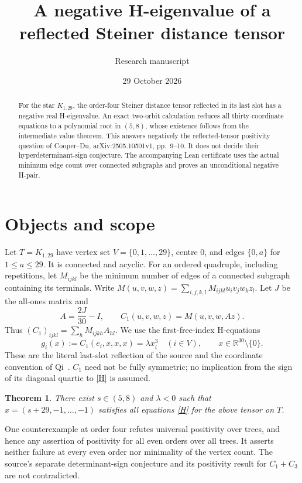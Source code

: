 \documentclass[11pt]{article}
\title{A negative H-eigenvalue of a reflected Steiner distance tensor}
\author{Research manuscript}
\date{29 October 2026}
\newtheorem{theorem}{Theorem}
\newcommand{\R}{\mathbb R}
\begin{document}
\maketitle
\begin{abstract}
For the star $K_{1,29}$, the order-four Steiner distance tensor reflected in its last slot has a negative real H-eigenvalue. An exact two-orbit calculation reduces all thirty coordinate equations to a polynomial root in $(5,8)$, whose existence follows from the intermediate value theorem. This answers negatively the reflected-tensor positivity question of Cooper--Du, arXiv:2505.10501v1, pp.~9--10. It does not decide their hyperdeterminant-sign conjecture. The accompanying Lean certificate uses the actual minimum edge count over connected subgraphs and proves an unconditional negative H-pair.
\end{abstract}

\section{Objects and scope}
Let $T=K_{1,29}$ have vertex set $V=\{0,1,\ldots,29\}$, centre $0$, and edges $\{0,a\}$ for $1\leq a\leq29$. It is connected and acyclic. For an ordered quadruple, including repetitions, let $M_{ijkl}$ be the minimum number of edges of a connected subgraph containing its terminals. Write $M(u,v,w,z)=\sum_{i,j,k,l}M_{ijkl}u_iv_jw_kz_l$. Let $J$ be the all-ones matrix and
\[
 A=\frac{2J}{30}-I,\qquad C_1(u,v,w,z)=M(u,v,w,Az).
\]
Thus $(C_1)_{ijkl}=\sum_hM_{ijkh}A_{hl}$. We use the first-free-index H-equations
\begin{equation}\label{H}
 g_i(x):=C_1(e_i,x,x,x)=\lambda x_i^3\quad(i\in V),\qquad x\in\R^{30}\setminus\{0\}.
\end{equation}
These are the literal last-slot reflection of the source and the coordinate convention of Qi~\cite{Qi}. $C_1$ need not be fully symmetric; no implication from the sign of its diagonal quartic to \eqref{H} is assumed.

\begin{theorem}\label{main}
There exist $s\in(5,8)$ and $\lambda<0$ such that $x=(s+29,-1,\ldots,-1)$ satisfies all equations \eqref{H} for the above tensor on $T$.
\end{theorem}

One counterexample at order four refutes universal positivity over trees, and hence any assertion of positivity for all even orders over all trees. It asserts neither failure at every even order nor minimality of the vertex count. The source's separate determinant-sign conjecture and its positivity result for $C_1+C_3$ are not contradicted.
\end{document}
